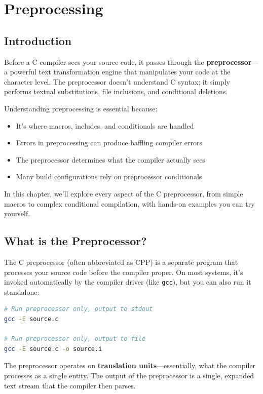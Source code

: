 \chapter{Preprocessing}

\section{Introduction}

Before a C compiler sees your source code, it passes through the \textbf{preprocessor}---a powerful text transformation engine that manipulates your code at the character level. The preprocessor doesn't understand C syntax; it simply performs textual substitutions, file inclusions, and conditional deletions.

Understanding preprocessing is essential because:
\begin{itemize}
    \item It's where macros, includes, and conditionals are handled
    \item Errors in preprocessing can produce baffling compiler errors
    \item The preprocessor determines what the compiler actually sees
    \item Many build configurations rely on preprocessor conditionals
\end{itemize}

In this chapter, we'll explore every aspect of the C preprocessor, from simple macros to complex conditional compilation, with hands-on examples you can try yourself.

\section{What is the Preprocessor?}

The C preprocessor (often abbreviated as CPP) is a separate program that processes your source code before the compiler proper. On most systems, it's invoked automatically by the compiler driver (like \texttt{gcc}), but you can also run it standalone:

\begin{lstlisting}[language=bash]
# Run preprocessor only, output to stdout
gcc -E source.c

# Run preprocessor only, output to file
gcc -E source.c -o source.i
\end{lstlisting}

The preprocessor operates on \textbf{translation units}---essentially, what the compiler processes as a single entity. The output of the preprocessor is a single, expanded text stream that the compiler then parses.

